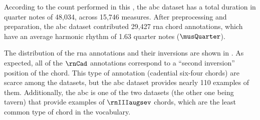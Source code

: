 
According to the count performed in this \thesisdiss{}, the
\gls{abc} dataset has a total duration in quarter notes of
48,034, across 15,746 measures. After preprocessing and
preparation, the \gls{abc} dataset contributed 29,427
\gls{rna} chord annotations, which have an average harmonic
rhythm of 1.63 quarter notes ($\musQuarter$).

The distribution of the \gls{rna} annotations and their
inversions are shown in . As
expected, all of the $\rnCad$ annotations correspond to a
``second inversion'' position of the chord. This type of
annotation (cadential six-four chords) are scarce among the
datasets, but the \gls{abc} dataset provides nearly 110
examples of them. Additionally, the \gls{abc} is one of the
two datasets (the other one being \gls{tavern}) that provide
examples of $\rnIIIaugsev$ chords, which are the least
common type of chord in the vocabulary.









